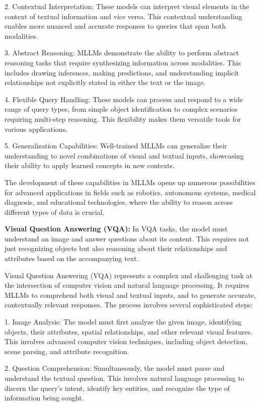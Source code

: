 2. Contextual Interpretation: These models can interpret visual elements in the context of textual information and vice versa. This contextual understanding enables more nuanced and accurate responses to queries that span both modalities.

3. Abstract Reasoning: MLLMs demonstrate the ability to perform abstract reasoning tasks that require synthesizing information across modalities. This includes drawing inferences, making predictions, and understanding implicit relationships not explicitly stated in either the text or the image.

4. Flexible Query Handling: These models can process and respond to a wide range of query types, from simple object identification to complex scenarios requiring multi-step reasoning. This flexibility makes them versatile tools for various applications.

5. Generalization Capabilities: Well-trained MLLMs can generalize their understanding to novel combinations of visual and textual inputs, showcasing their ability to apply learned concepts in new contexts.

The development of these capabilities in MLLMs opens up numerous possibilities for advanced applications in fields such as robotics, autonomous systems, medical diagnosis, and educational technologies, where the ability to reason across different types of data is crucial.

\textbf{Visual Question Answering (VQA):} In VQA tasks, the model must understand an image and answer questions about its content. This requires not just recognizing objects but also reasoning about their relationships and attributes based on the accompanying text.

Visual Question Answering (VQA) represents a complex and challenging task at the intersection of computer vision and natural language processing. It requires MLLMs to comprehend both visual and textual inputs, and to generate accurate, contextually relevant responses. The process involves several sophisticated steps:

1. Image Analysis: The model must first analyze the given image, identifying objects, their attributes, spatial relationships, and other relevant visual features. This involves advanced computer vision techniques, including object detection, scene parsing, and attribute recognition.

2. Question Comprehension: Simultaneously, the model must parse and understand the textual question. This involves natural language processing to discern the query's intent, identify key entities, and recognize the type of information being sought.

